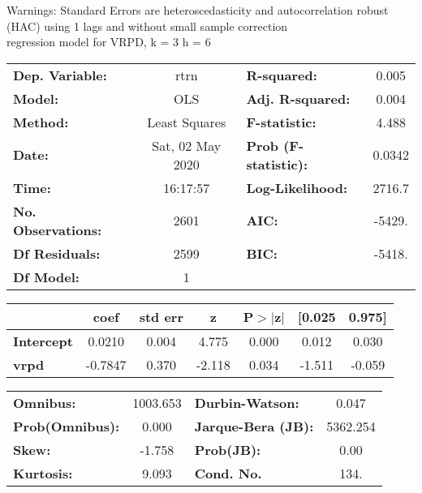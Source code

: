 Warnings: \newline
 [1] Standard Errors are heteroscedasticity and autocorrelation robust (HAC) using 1 lags and without small sample correction\\ 

regression model for VRPD, k = 3 h = 6\begin{center}
\begin{tabular}{lclc}
\toprule
\textbf{Dep. Variable:}    &       rtrn       & \textbf{  R-squared:         } &     0.005   \\
\textbf{Model:}            &       OLS        & \textbf{  Adj. R-squared:    } &     0.004   \\
\textbf{Method:}           &  Least Squares   & \textbf{  F-statistic:       } &     4.488   \\
\textbf{Date:}             & Sat, 02 May 2020 & \textbf{  Prob (F-statistic):} &   0.0342    \\
\textbf{Time:}             &     16:17:57     & \textbf{  Log-Likelihood:    } &    2716.7   \\
\textbf{No. Observations:} &        2601      & \textbf{  AIC:               } &    -5429.   \\
\textbf{Df Residuals:}     &        2599      & \textbf{  BIC:               } &    -5418.   \\
\textbf{Df Model:}         &           1      & \textbf{                     } &             \\
\bottomrule
\end{tabular}
\begin{tabular}{lcccccc}
                   & \textbf{coef} & \textbf{std err} & \textbf{z} & \textbf{P$> |$z$|$} & \textbf{[0.025} & \textbf{0.975]}  \\
\midrule
\textbf{Intercept} &       0.0210  &        0.004     &     4.775  &         0.000        &        0.012    &        0.030     \\
\textbf{vrpd}      &      -0.7847  &        0.370     &    -2.118  &         0.034        &       -1.511    &       -0.059     \\
\bottomrule
\end{tabular}
\begin{tabular}{lclc}
\textbf{Omnibus:}       & 1003.653 & \textbf{  Durbin-Watson:     } &    0.047  \\
\textbf{Prob(Omnibus):} &   0.000  & \textbf{  Jarque-Bera (JB):  } & 5362.254  \\
\textbf{Skew:}          &  -1.758  & \textbf{  Prob(JB):          } &     0.00  \\
\textbf{Kurtosis:}      &   9.093  & \textbf{  Cond. No.          } &     134.  \\
\bottomrule
\end{tabular}
\end{center}

